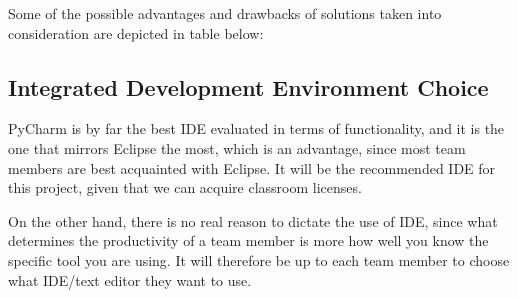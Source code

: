 Some of the possible advantages and drawbacks of solutions taken into
consideration are depicted in table below:
\begin{table}[H] \footnotesize \center
\caption{Configuration overview}
\noindent{}
\end{table}

\subsection{Integrated Development Environment Choice}
PyCharm is by far the best IDE evaluated in terms of functionality, and it is
the one that mirrors Eclipse the most, which is an advantage, since most team
members are best acquainted with Eclipse. It will be the recommended IDE for
this project, given that we can acquire classroom licenses.

On the other hand, there is no real reason to dictate the use of IDE, since
what determines the productivity of a team member is more how well you know
the specific tool you are using. It will therefore be up to each team member
to choose what IDE/text editor they want to use.


